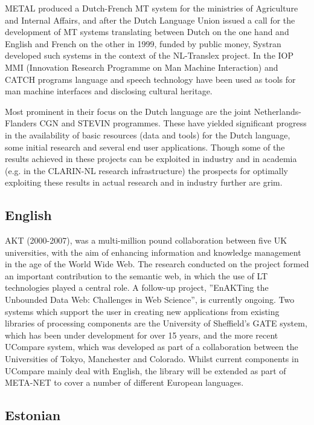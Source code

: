 \documentclass[10pt, plain]{../../metanetpaper}
\begin{document}
\begin{multicols}{2}
METAL produced a Dutch-French MT system for the ministries of Agriculture and Internal Affairs, and after the Dutch Language Union issued a call for the development of MT systems translating between Dutch on the one hand and English and French on the other in 1999, funded by public money, Systran developed such systems in the context of the NL-Translex project. In the IOP MMI (Innovation Research Programme on Man Machine Interaction) and CATCH programs language and speech technology have been used as tools for man machine interfaces and disclosing cultural heritage.

Most prominent in their focus on the Dutch language are the joint Netherlands-Flanders CGN and STEVIN programmes. These have yielded significant progress in the availability of basic resources (data and tools) for the Dutch language, some initial research and several end user applications. Though some of the results achieved in these projects can be exploited in industry and in academia (e.g. in the CLARIN-NL research infrastructure) the prospects for optimally exploiting these results in actual research and in industry further are grim. 

\subsection*{English}
\label{sec:english}

AKT (2000-2007), was a multi-million pound collaboration between five UK universities, with the aim of enhancing information and knowledge management in the age of the World Wide Web. The research conducted on the project formed an important contribution to the semantic web, in which the use of LT technologies played a central role. A follow-up project, ”EnAKTing the Unbounded Data Web: Challenges in Web Science”, is currently ongoing.
Two systems which support the user in creating new applications from existing libraries of processing components are the University of Sheffield’s GATE system, which has been under development for over 15 years, and the more recent UCompare system, which was developed as part of a collaboration between the Universities of Tokyo, Manchester and Colorado. Whilst current components in UCompare mainly deal with English, the library will be extended as part of META-NET to cover a number of different European languages.

\subsection*{Estonian}
\label{sec:estonian}


\end{multicols}
\end{document}
